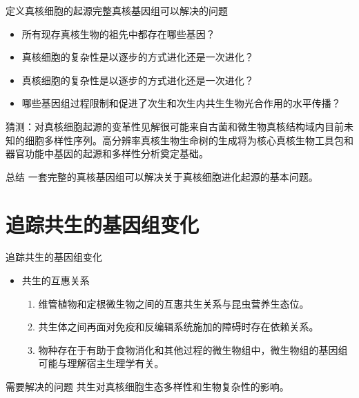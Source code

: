 \documentclass{beamer}
\begin{document}
	
\begin{frame}{定义真核细胞的起源}{完整真核基因组可以解决的问题}
	\begin{itemize}
		\item 所有现存真核生物的祖先中都存在哪些基因？
		\item 真核细胞的复杂性是以逐步的方式进化还是一次进化？
		\item 真核细胞的复杂性是以逐步的方式进化还是一次进化？
		\item 哪些基因组过程限制和促进了次生和次生内共生生物光合作用的水平传播？
	\end{itemize}

	猜测：对真核细胞起源的变革性见解很可能来自古菌和微生物真核结构域内目前未知的细胞多样性序列。高分辨率真核生物生命树的生成将为核心真核生物工具包和器官功能中基因的起源和多样性分析奠定基础。

	\begin{alertblock}{总结}
		一套完整的真核基因组可以解决关于真核细胞进化起源的基本问题。
	\end{alertblock}
\end{frame}

	
	\section{追踪共生的基因组变化}
	\begin{frame}{追踪共生的基因组变化}

		\begin{itemize}
			\item 共生的互惠关系
			\begin{enumerate}
				\item 维管植物和定根微生物之间的互惠共生关系与昆虫营养生态位。
				\item 共生体之间再面对免疫和反编辑系统施加的障碍时存在依赖关系。
				\item 物种存在于有助于食物消化和其他过程的微生物组中，微生物组的基因组可能与理解宿主生理学有关。
			\end{enumerate}
		\end{itemize}

		\begin{alertblock}{需要解决的问题}
			共生对真核细胞生态多样性和生物复杂性的影响。
		\end{alertblock}
	\end{frame}

\end{document}
